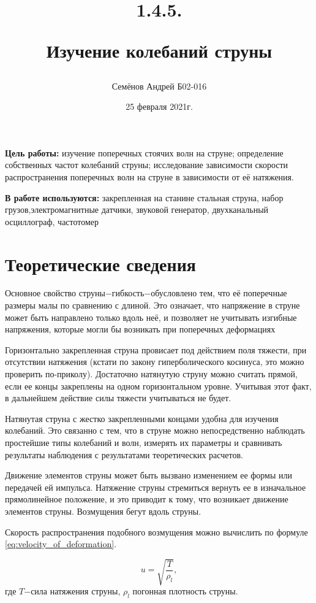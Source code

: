 \documentclass[12pt,a4paper]{article}
\title{
1.4.5.

Изучение колебаний струны
}
\author{Семёнов Андрей Б02-016}
\date{25 февраля 2021г.}
\begin{document}
\maketitle
\newpage

\textbf{Цель работы:} изучение поперечных стоячих волн на струне; определение собственных частот колебаний струны;
исследование зависимости скорости распространения поперечных волн на струне в зависимости от её натяжения.

\textbf{В работе используются:} закрепленная на станине стальная струна, набор грузов,электромагнитные датчики, звуковой генератор, двухканальный осциллограф, частотомер

\section{Теоретические сведения}
Основное свойство струны$-$гибкость$-$обусловлено тем, что её поперечные размеры малы по сравнению с длиной. Это означает, что напряжение в струне может быть направлено только вдоль неё, и позволяет не учитывать изгибные напряжения, которые могли бы возникать при поперечных деформациях

Горизонтально закрепленная струна провисает под действием поля тяжести, при отсутствии натяжения (кстати по закону гиперболического косинуса, это можно проверить по-приколу). Достаточно натянутую струну можно считать прямой, если ее концы закреплены на одном горизонтальном уровне. Учитывая этот факт, в дальнейшем действие силы тяжести учитываться не будет.

Натянутая струна с жестко закрепленными концами удобна для изучения колебаний. Это связанно с тем, что в струне можно непосредственно наблюдать простейшие типы колебаний и волн, измерять их параметры и сравнивать результаты наблюдения с результатами теоретических расчетов.

Движение элементов струны может быть вызвано изменением ее формы или передачей ей импульса. Натяжение струны стремиться вернуть ее в изначальное прямолинейное положение, и это приводит к тому, что возникает движение элементов струны. Возмущения бегут вдоль струны.

Скорость распространения подобного возмущения можно вычислить по формуле \ref{eq:velocity_of_deformation}.

\begin{equation}
	u = \sqrt{\frac{T}{\rho_{l}}},
	\label{eq:velocity_of_deformation}
\end{equation}
где $T$$-$сила натяжения струны, $\rho_{l}$ погонная плотность струны.
\end{document}

